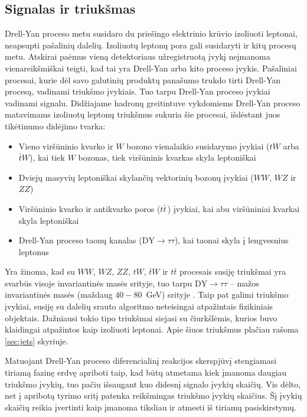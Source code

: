 \documentclass[a4paper, 12pt, oneside]{article}
\newcommand{\ZZ}{Z\! Z}
\newcommand{\WZ}{W\! Z}
\newcommand{\tbarW}{\bar{t}W}
\newcommand{\ttbar}{t\bar{t}}
\newcommand{\DYtau}{\mathrm{DY} \! \rightarrow \! \tau\tau}
\begin{document}
\subsection{Signalas ir triukšmas}\label{sec:sig_bkg}
Drell-Yan proceso metu susidaro du priešingo elektrinio krūvio izoliuoti leptonai, neapsupti pašalinių dalelių.
Izoliuotų leptonų pora gali susidaryti ir kitų procesų metu.
Atskirai paėmus vieną detektoriaus užregistruotą įvykį neįmanoma vienareikšmiškai teigti, kad tai yra Drell-Yan
arba kito proceso įvykis.
Pašaliniai procesai, kurie dėl savo galutinių produktų panašumo trukdo tirti Drell-Yan procesą, vadinami triukšmo įvykiais.
Tuo tarpu Drell-Yan proceso įvykiai vadinami signalu.
Didžiajame hadronų greitintuve vykdomiems Drell-Yan proceso matavimams izoliuotų leptonų triukšmus sukuria šie procesai,
išdėstant juos tikėtinumo didėjimo tvarka:
\begin{itemize}
	\item Vieno viršūninio kvarko ir $W$ bozono vienalaikio susidarymo įvykiai ($tW$ arba $\tbarW$), kai tiek $W$ bozonas,
	tiek viršūninis kvarkas skyla leptoniškai
	\item Dviejų masyvių leptoniškai skylančių vektorinių bozonų įvykiai ($WW$, $\WZ$ ir $\ZZ$)	
	\item Viršūninio kvarko ir antikvarko poros ($\ttbar\,$) įvykiai, kai abu viršūniniai kvarkai skyla leptoniškai
	\item Drell-Yan proceso taonų kanalas ($\DYtau$), kai taonai skyla į lengvesnius leptonus
\end{itemize}
Yra žinoma, kad su $WW$, $\WZ$, $\ZZ$, $tW$, $\tbarW$ ir $\ttbar$ procesais susiję triukšmai yra svarbūs visoje invariantinės
masės srityje, tuo tarpu $\DYtau$ -- mažos invariantinės masės (maždaug $40-80$~GeV) srityje
\cite{DY_CMS2011, DY_CMS2013, DY_CMS2015, DY_CMS2019}.
Taip pat galimi triukšmo įvykiai, susiję su dalelių srauto algoritmo neteisingai atpažintais fizikiniais objektais.
Dažniausi tokio tipo triukšmai siejasi su čiurkšlėmis, kurios buvo klaidingai atpažintos kaip izoliuoti leptonai.
Apie šiuos triukšmus plačiau rašoma \ref{sec:jets} skyriuje.

Matuojant Drell-Yan proceso diferencialinį reakcijos skerspjūvį stengiamasi tiriamą fazinę erdvę apriboti taip, kad būtų
atmetama kiek įmanoma daugiau triukšmo įvykių, tuo pačiu išsaugant kuo didesnį signalo įvykių skaičių.
Vis dėlto, net į apribotą tyrimo sritį patenka reikšmingas triukšmo įvykių skaičius.
Šį įvykių skaičių reikia įvertinti kaip įmanoma tiksliau ir atmesti iš tiriamų pasiskirstymų.
\end{document}
